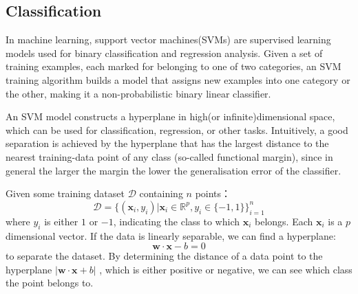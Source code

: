 \documentclass{vldb}
\begin{document}
\subsection{Classification}
In machine learning, support vector machines(SVMs)\cite{mining} are supervised learning models used for binary classification and regression analysis. Given a set of training examples, each marked for belonging to one of two categories, an SVM training algorithm builds a model that assigns new examples into one category or the other, making it a non-probabilistic binary linear classifier. 
\par An SVM model constructs a hyperplane in high(or infinite)dimensional space, which can be used for classification, regression, or other tasks. Intuitively, a good separation is achieved by the hyperplane that has the largest distance to the nearest training-data point of any class (so-called functional margin), since in general the larger the margin the lower the generalisation error of the classifier.
\par Given some training dataset $\mathcal{D}$ containing $n$ points：
\begin{displaymath}
\mathcal{D} = \{(\mathbf{x}_i,y_i)|\mathbf{x}_i \in \mathbb{R}^p,y_i\in\{-1,1\}\}^n _{i=1}
\end{displaymath}
where $y_i$ is either $1$ or $-1$, indicating the class to which $\mathbf{x}_i$ belongs. Each $\mathbf{x}_i$ is a $p$ dimensional vector. If the data is linearly separable, we can find a hyperplane:
\begin{displaymath}
\mathbf{w}\cdot\mathbf{x}-b=0 
\end{displaymath}
to separate the dataset. By determining the distance of a data point to the hyperplane $|\mathbf{w}\cdot\mathbf{x}+b|$ , which is either positive or negative, we can see which class the point belongs to.
\end{document}
